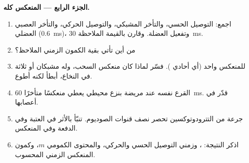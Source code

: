 \begin{problem}
\medskip
\noindent\textbf{الجزء الرابع --- المنعكس كله.}
\begin{enumerate}[resume]
  \item اجمع: التوصيل الحسي، والتأخر المشبكي، والتوصيل الحركي،
        والتأخر العصبي العضلي (\qty{0.6}{ms})، وتفعيل العضلة. وقارن
        بالقيمة الملاحظة \qty{30}{ms}.
  \item من أين تأتي بقية الكمون الزمني الملاحظ؟
  \item للمنعكس  واحد (أي أحادي ). فسّر لماذا كان منعكس
        السحب، وله مشبكان أو ثلاثة في النخاع،
        أبطأ لكنه أطوع.
  \item القرع نفسه عند مريضة بنزع  محيطي
        يعطي منعكسًا متأخرًا \qty{60}{ms}. قدّر 
        في أعصابها.
  \item جرعة من التترودوتوكسين تحصر نصف قنوات الصوديوم.
        تنبّأ بالأثر في العتبة وفي الدفعة وفي
        المنعكس.
  \item اذكر النتيجة: ، وزمني التوصيل
        الحسي والحركي، والمحتوى الكمومي $m$، وكمون
        المنعكس الزمني المحسوب.
\end{enumerate}
\end{problem}
